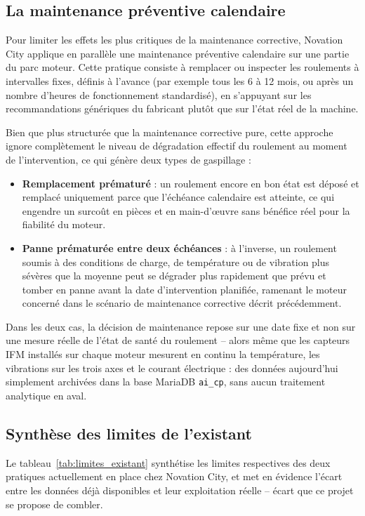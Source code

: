 \documentclass[12pt,a4paper]{report}
\begin{document}
\subsection{La maintenance préventive calendaire}

Pour limiter les effets les plus critiques de la maintenance corrective, Novation City applique en
parallèle une maintenance préventive calendaire sur une partie du parc moteur. Cette pratique
consiste à remplacer ou inspecter les roulements à intervalles fixes, définis à l'avance (par
exemple tous les 6 à 12 mois, ou après un nombre d'heures de fonctionnement standardisé), en
s'appuyant sur les recommandations génériques du fabricant plutôt que sur l'état réel de la
machine.

Bien que plus structurée que la maintenance corrective pure, cette approche ignore complètement le
niveau de dégradation effectif du roulement au moment de l'intervention, ce qui génère deux types
de gaspillage :
\begin{itemize}
  \item \textbf{Remplacement prématuré} : un roulement encore en bon état est déposé et remplacé
  uniquement parce que l'échéance calendaire est atteinte, ce qui engendre un surcoût en pièces et
  en main-d'œuvre sans bénéfice réel pour la fiabilité du moteur.
  \item \textbf{Panne prématurée entre deux échéances} : à l'inverse, un roulement soumis à des
  conditions de charge, de température ou de vibration plus sévères que la moyenne peut se
  dégrader plus rapidement que prévu et tomber en panne avant la date d'intervention planifiée,
  ramenant le moteur concerné dans le scénario de maintenance corrective décrit précédemment.
\end{itemize}

Dans les deux cas, la décision de maintenance repose sur une date fixe et non sur une mesure
réelle de l'état de santé du roulement -- alors même que les capteurs IFM installés sur chaque
moteur mesurent en continu la température, les vibrations sur les trois axes et le courant
électrique : des données aujourd'hui simplement archivées dans la base MariaDB \texttt{ai\_cp},
sans aucun traitement analytique en aval.

\subsection{Synthèse des limites de l'existant}

Le tableau~\ref{tab:limites_existant} synthétise les limites respectives des deux pratiques
actuellement en place chez Novation City, et met en évidence l'écart entre les données déjà
disponibles et leur exploitation réelle -- écart que ce projet se propose de combler.
\end{document}

